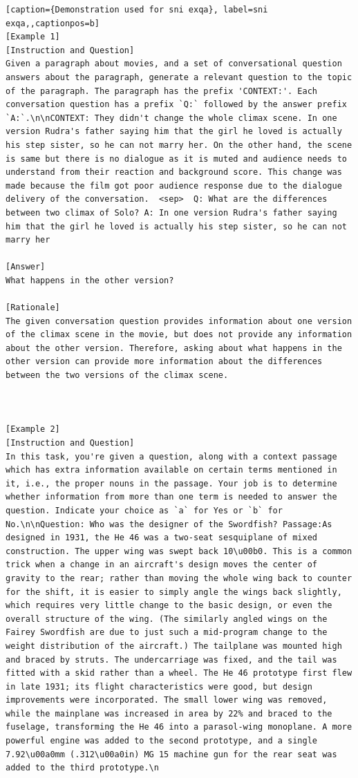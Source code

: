 \begin{lstlisting}[caption={Demonstration used for sni exqa}, label=sni exqa,,captionpos=b]
[Example 1]
[Instruction and Question]
Given a paragraph about movies, and a set of conversational question answers about the paragraph, generate a relevant question to the topic of the paragraph. The paragraph has the prefix 'CONTEXT:'. Each conversation question has a prefix `Q:` followed by the answer prefix `A:`.\n\nCONTEXT: They didn't change the whole climax scene. In one version Rudra's father saying him that the girl he loved is actually his step sister, so he can not marry her. On the other hand, the scene is same but there is no dialogue as it is muted and audience needs to understand from their reaction and background score. This change was made because the film got poor audience response due to the dialogue delivery of the conversation.  <sep>  Q: What are the differences between two climax of Solo? A: In one version Rudra's father saying him that the girl he loved is actually his step sister, so he can not marry her

[Answer]
What happens in the other version?

[Rationale]
The given conversation question provides information about one version of the climax scene in the movie, but does not provide any information about the other version. Therefore, asking about what happens in the other version can provide more information about the differences between the two versions of the climax scene.



[Example 2]
[Instruction and Question]
In this task, you're given a question, along with a context passage which has extra information available on certain terms mentioned in it, i.e., the proper nouns in the passage. Your job is to determine whether information from more than one term is needed to answer the question. Indicate your choice as `a` for Yes or `b` for No.\n\nQuestion: Who was the designer of the Swordfish? Passage:As designed in 1931, the He 46 was a two-seat sesquiplane of mixed construction. The upper wing was swept back 10\u00b0. This is a common trick when a change in an aircraft's design moves the center of gravity to the rear; rather than moving the whole wing back to counter for the shift, it is easier to simply angle the wings back slightly, which requires very little change to the basic design, or even the overall structure of the wing. (The similarly angled wings on the Fairey Swordfish are due to just such a mid-program change to the weight distribution of the aircraft.) The tailplane was mounted high and braced by struts. The undercarriage was fixed, and the tail was fitted with a skid rather than a wheel. The He 46 prototype first flew in late 1931; its flight characteristics were good, but design improvements were incorporated. The small lower wing was removed, while the mainplane was increased in area by 22% and braced to the fuselage, transforming the He 46 into a parasol-wing monoplane. A more powerful engine was added to the second prototype, and a single 7.92\u00a0mm (.312\u00a0in) MG 15 machine gun for the rear seat was added to the third prototype.\n


\end{lstlisting}
